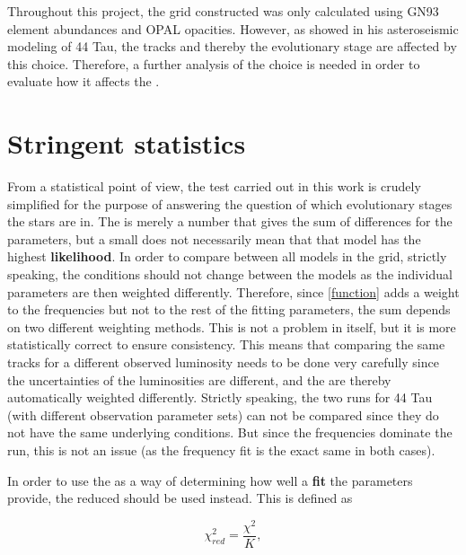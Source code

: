 
Throughout this project, the grid constructed was only calculated using GN93 element abundances and OPAL opacities. However, as \citet{lenz2010delta} showed in his asteroseismic modeling of 44 Tau,  the tracks and thereby the evolutionary stage are affected by this choice. Therefore, a further analysis of the choice is needed in order to evaluate how it affects the \chis.  


\section{Stringent statistics}

From a statistical point of view, the \chis test carried out in this work is crudely simplified for the purpose of answering the question of which evolutionary stages the stars are in. The \chis is merely a number that gives the sum of differences for the parameters, but a small \chis does not necessarily mean that that model has the highest \textbf{likelihood}. In order to compare \chis between all models in the grid, strictly speaking, the conditions should not change between the models as the individual parameters are then weighted differently. Therefore, since \eqref{function} adds a weight to the frequencies but not to the rest of the fitting parameters, the \chis sum depends on two different weighting methods. This is not a problem in itself, but it is more statistically correct to ensure consistency.  This means that comparing the same tracks for a different observed luminosity needs to be done very carefully since the uncertainties of the luminosities are different, and the \chis are thereby automatically weighted differently. Strictly speaking, the two runs for 44 Tau (with different observation parameter sets) can not be compared since they do not have the same underlying conditions. But since the frequencies dominate the run, this is not an issue (as the frequency fit is the exact same in both cases). 

In order to use the \chis as a way of determining how well a \textbf{fit} the parameters provide,  the reduced \chis should be used instead. This is defined as 

\begin{equation}
	\chi_{red}^2 = \frac{\chi^2}{K} ,
\end{equation}

